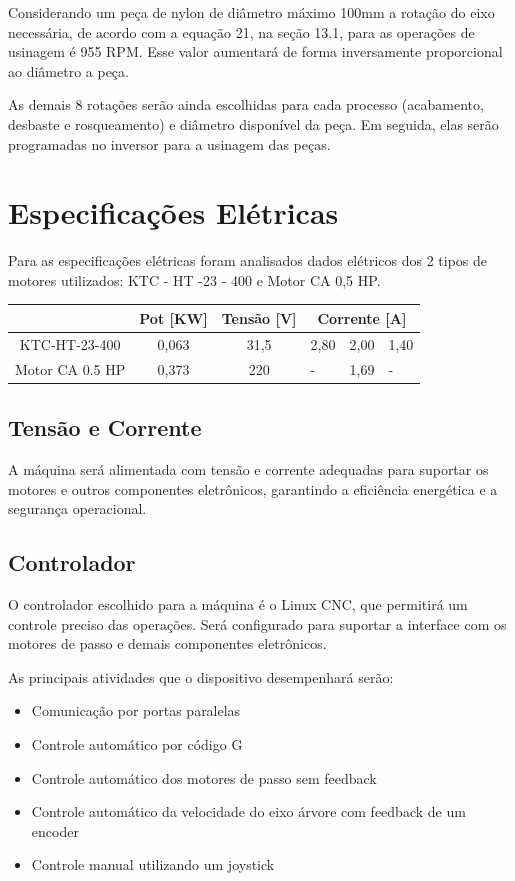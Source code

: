 Considerando um peça de nylon de diâmetro máximo 100mm a rotação do eixo necessária, de acordo com a equação 21, na seção 13.1, para as operações de usinagem é 955 RPM. Esse valor aumentará de forma inversamente proporcional ao diâmetro a peça. 

As demais 8 rotações serão ainda escolhidas para cada processo (acabamento, desbaste e rosqueamento) e diâmetro disponível da peça. Em seguida, elas serão programadas no inversor para a usinagem das peças.  

\section{Especificações Elétricas}

Para as especificações elétricas foram analisados dados elétricos dos 2 tipos de motores utilizados: KTC - HT -23 - 400 e Motor CA 0,5 HP. 


\begin{table}
    \centering
    \begin{tabular}{|c|c|c|l|l|l|} \hline 
         &  Pot  [KW]& Tensão [V] & \multicolumn{3}{|c|}{Corrente [A]}\\ \hline 
         KTC-HT-23-400&  0,063&  31,5& 2,80& 2,00&1,40
\\ \hline 
         Motor CA 0.5 HP&  0,373&  220& -& 1,69&-
\\ \hline
    \end{tabular}
    \label{tab:my_label}
\end{table}

\subsection{Tensão e Corrente}
A máquina será alimentada com tensão e corrente adequadas para suportar os motores e outros componentes eletrônicos, garantindo a eficiência energética e a segurança operacional.

\subsection{Controlador}
O controlador escolhido para a máquina é o Linux CNC, que permitirá um controle preciso das operações. Será configurado para suportar a interface com os motores de passo e demais componentes eletrônicos.

As principais atividades que o dispositivo desempenhará serão:
\begin{itemize}
    \item Comunicação por portas paralelas
    \item Controle automático por código G
    \item Controle automático dos motores de passo sem feedback
    \item Controle automático da velocidade do eixo árvore com feedback de um encoder
    \item Controle manual utilizando um joystick
\end{itemize}

